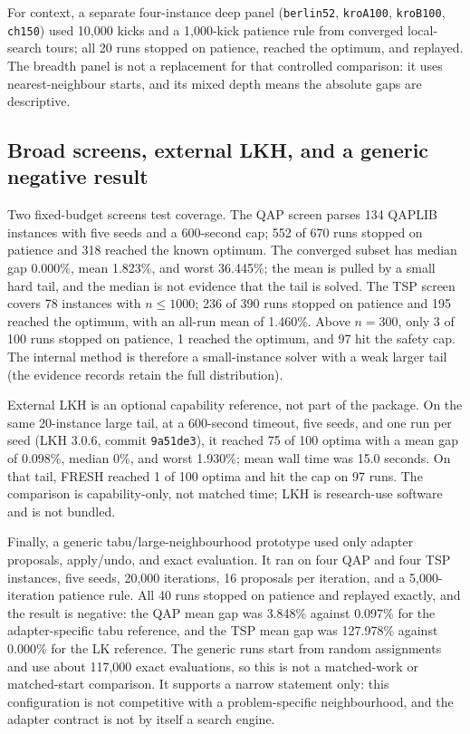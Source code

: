 \documentclass[10pt]{article}
\begin{document}
For context, a separate four-instance deep panel (\texttt{berlin52}, \texttt{kroA100},
\texttt{kroB100}, \texttt{ch150}) used 10,000 kicks and a 1,000-kick patience rule from converged
local-search tours; all 20 runs stopped on patience, reached the optimum, and replayed. The breadth
panel is not a replacement for that controlled comparison: it uses nearest-neighbour starts, and its
mixed depth means the absolute gaps are descriptive.

\subsection{Broad screens, external LKH, and a generic negative result}

Two fixed-budget screens test coverage. The QAP screen parses 134 QAPLIB instances with five seeds
and a 600-second cap; 552 of 670 runs stopped on patience and 318 reached the known optimum. The
converged subset has median gap 0.000\%, mean 1.823\%, and worst 36.445\%; the mean is pulled by a
small hard tail, and the median is not evidence that the tail is solved. The TSP screen covers 78
instances with $n\le1000$; 236 of 390 runs stopped on patience and 195 reached the optimum, with an
all-run mean of 1.460\%. Above $n=300$, only 3 of 100 runs stopped on patience, 1 reached the
optimum, and 97 hit the safety cap. The internal method is therefore a small-instance solver with a
weak larger tail (the evidence records retain the full distribution).



External LKH \citep{lkh3} is an optional capability reference, not part of the package. On the same 20-instance
large tail, at a 600-second timeout, five seeds, and one run per seed (LKH 3.0.6, commit
\texttt{9a51de3}), it reached 75 of 100 optima with a mean gap of 0.098\%, median 0\%, and worst
1.930\%; mean wall time was 15.0 seconds. On that tail, FRESH reached 1 of 100 optima and hit the cap
on 97 runs. The comparison is capability-only, not matched time; LKH is research-use software and is
not bundled.

Finally, a generic tabu/large-neighbourhood prototype used only adapter proposals, apply/undo, and
exact evaluation. It ran on four QAP and four TSP instances, five seeds, 20,000 iterations, 16
proposals per iteration, and a 5,000-iteration patience rule. All 40 runs stopped on patience and
replayed exactly, and the result is negative: the QAP mean gap was 3.848\% against 0.097\% for the
adapter-specific tabu reference, and the TSP mean gap was 127.978\% against 0.000\% for the LK
reference. The generic runs start from random assignments and use about 117,000 exact evaluations,
so this is not a matched-work or matched-start comparison. It supports a narrow statement only:
this configuration is not competitive with a problem-specific neighbourhood, and the adapter
contract is not by itself a search engine.
\end{document}
